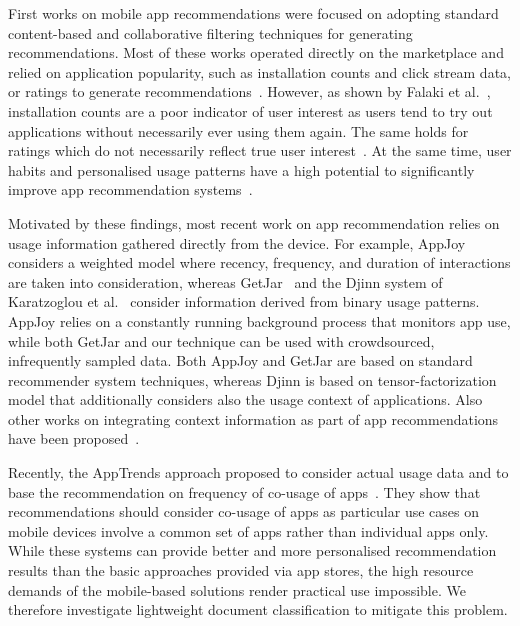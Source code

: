 \documentclass{sigchi}
\begin{document}
First works on mobile app recommendations were focused on adopting standard content-based and collaborative filtering techniques for generating recommendations. 
Most of these works operated directly on the marketplace and relied on application popularity, such as installation counts and click stream data, or ratings to generate recommendations~\cite{Bostrom:2008:CIU:1409240.1409280}. 
However, as shown by Falaki et al.~\cite{Falaki-mobisys-2010}, installation counts are a poor indicator of user interest as users tend to try out applications without necessarily ever using them again.
The same holds for ratings which do not necessarily reflect true user interest~\cite{Yan-mobisys-2011}. 
At the same time, user habits and personalised usage patterns have a high potential to significantly improve app recommendation systems~\cite{Bohmer-mobilechi-2011}.

Motivated by these findings, most recent work on app recommendation relies on usage information gathered directly from the device. 
For example, AppJoy~\cite{Yan-mobisys-2011} considers a weighted model where recency, frequency, and duration of interactions are taken into consideration, whereas GetJar~\cite{Shi-sigkdd-2012} and the Djinn system of Karatzoglou et al.~\cite{Karatzoglou-cikm-2012} consider information derived from binary usage patterns. AppJoy relies on a constantly running background process that monitors app use, while both GetJar and our technique can be used with crowdsourced,
infrequently sampled data.
Both AppJoy and GetJar are based on standard recommender system techniques, whereas Djinn is based on tensor-factorization model that additionally considers also the usage context of applications. 
Also other works on integrating context information as part of app recommendations have been proposed~\cite{Mizzaro-carr-2014, Davidsson-carr-2011, woerndl-2007}. 

Recently, the AppTrends approach proposed to consider actual usage data and to base the recommendation on frequency of co-usage of apps~\cite{7072833}.
They show that recommendations should consider co-usage of apps as particular use cases on mobile devices involve a common set of apps rather than individual apps only. 
While these systems can provide better and more personalised recommendation results than the basic approaches provided via app stores, the high resource demands of the mobile-based solutions render practical use impossible.
We therefore investigate lightweight document classification to mitigate this problem.
\end{document}
